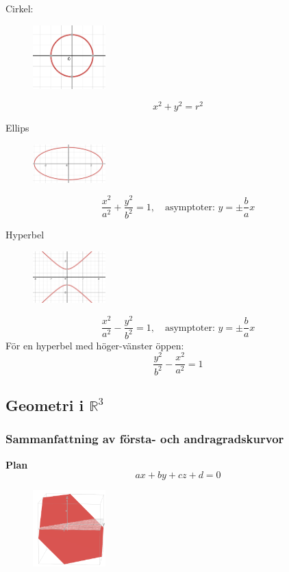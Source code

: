 \documentclass[a4paper,12pt]{article}
\begin{document}
Cirkel:
\begin{figure}[H]
  \centering
  \includegraphics[width=0.25\textwidth]{cirkel.png}
\end{figure}
\[
x^2 + y^2 = r^2
\]

Ellips
\begin{figure}[H]
  \centering
  \includegraphics[width=0.25\textwidth]{ellips.png}
\end{figure}
\[
\frac{x^2}{a^2} + \frac{y^2}{b^2} = 1, \quad \text{asymptoter: } y = \pm \frac{b}{a}x
\]

Hyperbel
\begin{figure}[H]
  \centering
  \includegraphics[width=0.25\textwidth]{hyperbel.png}
\end{figure}
\[
\frac{x^2}{a^2} - \frac{y^2}{b^2} = 1, \quad \text{asymptoter: } y = \pm \frac{b}{a}x
\]
För en hyperbel med höger-vänster öppen:
\[
\frac{y^2}{b^2} - \frac{x^2}{a^2} = 1
\]

\subsection{Geometri i $\mathbb{R}^3$}
\subsubsection*{Sammanfattning av första- och andragradskurvor}

\textbf{Plan}
\[
ax + by + cz + d = 0
\]
\begin{figure}[H]
  \centering
  \includegraphics[width=0.25\textwidth]{plan.png}
\end{figure}
\end{document}
